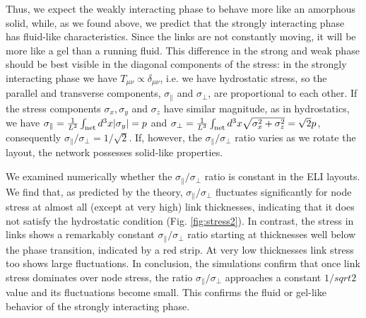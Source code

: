\documentclass[nofootinbib,preprint,floatfix,titlepage,endfloats,superscriptaddress]{revtex4} %
\newcommand{\outNim}[1]{}
\begin{document}
\outNim{

In the strongly interacting limit, the links fill up most of the space and nodes are more than $2r_N$ apart from each other, therefore $V_{NN} \sim 0$. 
In the final equilibrium most links are in contact with other links along their entire length. 
Consequently, 
we get 
    $\sum_{<ab>}\int ds_l ds_m \hat{x}_{ab \mu} \hat{x}_{ab\nu} \sim  L\be{l^2} \delta_{\mu\nu}.$ 
where $<ab>$ means adjacent links, $L$ is the number of links and $\be{l^2}$ is the average square link length. 
The other term in $V_{LL}$ is
$\delta_{\mu\nu}\sum_{<ab>}\int ds_l ds_m \approx L \be{l}^2 $
Thus, in the strongly interacting phase the stress tensor is approximately
\begin{align}
    \int dx T_{\mu\nu} & \approx \delta_{\mu\nu} \pr{k + L Ae^{-1} {\sigma_l^2\over 4r_L^2} }
    \label{eq:Tstrong}
\end{align}
with $\sigma_l^2 = \be{l^2} - \be{l}^2$. 

} %
Thus, we expect the weakly interacting phase to behave more like an amorphous solid, while, as we found above, we predict that the strongly interacting phase has fluid-like characteristics. 
Since the links are not constantly moving, it will be more like a gel than a running fluid. 
This difference in the strong and weak phase should be best visible in the diagonal components of the stress: in the strongly interacting phase we have $T_{\mu\nu} \propto \delta_{\mu\nu}$, i.e. we have hydrostatic stress, so the parallel and transverse components, $\sigma_\parallel$ and $\sigma_\perp$, are proportional to each other.  
If the stress components $\sigma_x, \sigma_y$ and $\sigma_z$ have similar magnitude, as in hydrostatics, we have $ \sigma_\parallel ={1\over L^3} \int_\mathrm{net} d^3x |\sigma_y| = p$ and $\sigma_\perp = {1\over L^3} \int_\mathrm{net} d^3x \sqrt{\sigma_x^2+ \sigma_z^2} = \sqrt{2} p$, consequently
 $ \sigma_\parallel/\sigma_\perp = 1/\sqrt{2}$.
If, however, the $ \sigma_\parallel/\sigma_\perp$ ratio varies as we rotate the layout, the network possesses solid-like properties. 

We examined numerically whether the $ \sigma_\parallel/ \sigma_\perp$ ratio is constant in the ELI layouts.
We find that, as predicted by the theory, $\sigma_\parallel/\sigma_\perp$ fluctuates significantly for node stress at almost all (except at very high) link thicknesses, indicating that it does not satisfy the hydrostatic condition (Fig. \ref{fig:stress2}).%
In contrast, the stress in links shows a remarkably constant  $\sigma_\parallel/\sigma_\perp$ ratio starting at thicknesses well below the phase transition, indicated by a red strip. 
At very low thicknesses link stress too shows large fluctuations. 
In conclusion, the simulations confirm that once link stress dominates over node stress, the ratio $\sigma_\parallel/\sigma_\perp$ approaches a constant $1/sqrt{2}$ value and its fluctuations become small. 
This confirms the fluid or gel-like behavior of the strongly interacting phase.  
\end{document}
